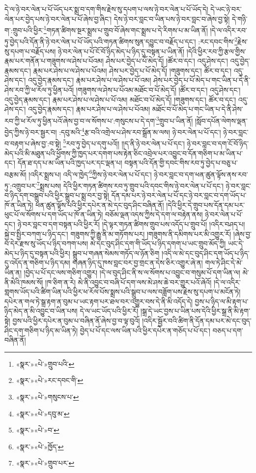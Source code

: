 དེ་ལ་ཉེ་བར་ལེན་པ་པོ་ཡོད་པར་སྨྲ་བ་དག་གིས་རྗེས་སུ་དཔག་པ་ལས་ཉེ་བར་ལེན་པ་པོ་ཡོད་དེ། དེ་ཡང་ཉེ་བར་ལེན་པར་བྱེད་པས་ཉེ་བར་ལེན་པ་པོ་ཞེས་བྱ་ཞིང་། དེས་ཉེ་བར་བླང་བ་ཡིན་པས་ཉེ་བར་བླང་བ་ཞེས་བྱ་སྟེ། དེ་གཉི་ག་:གྲུབ་པའི་ཕྱིར་\footnote{«སྣར་»«པེ་»གྲུབ་པའི་}གཏན་ཚིགས་སྔར་སྨྲས་པ་གྲུབ་བོ་ཞེས་གང་སྨྲས་པ་དེ་རིགས་པ་མ་ཡིན་ནོ། །དེ་ལ་འདིར་རབ་ཏུ་བྱེད་པའི་དོན་ནི་ཉེ་བར་ལེན་པ་པོ་ཡོད་པའི་གཏན་ཚིགས་སུན་དབྱུང་བ་བརྗོད་པ་དང་། :རང་དབང་གིས་\footnote{«སྣར་»«པེ་»རང་དབང་གི་}རྗེས་སུ་དཔག་པ་བརྗོད་པས། ཉེ་བར་ལེན་པ་པོ་ངོ་བོ་ཉིད་མེད་པ་ཉིད་དུ་བསྟན་པ་ཡིན་ནོ། །དེའི་ཕྱིར་རབ་ཀྱི་རྩལ་གྱིས་རྣམ་པར་གནོན་པ་གཟུགས་ལ་ཤེས་པ་པོའམ། ཤེས་པར་བྱེད་པ་པོ་མེད་དོ། །ཚོར་བ་དང་། འདུ་ཤེས་དང་། འདུ་བྱེད་རྣམས་དང་། རྣམ་པར་ཤེས་པ་ལ་ཤེས་པ་པོའམ། ཤེས་པར་བྱེད་པ་པོ་མེད་དོ། །གཟུགས་དང་། ཚོར་བ་དང་། འདུ་ཤེས་དང་། འདུ་བྱེད་རྣམས་དང་། རྣམ་པར་ཤེས་པ་ལ་ཤེས་པ་པོ་འམ། ཤེས་པར་བྱེད་པ་པོ་མེད་པ་གང་ཡིན་པ་དེ་ནི་ཤེས་རབ་ཀྱི་ཕ་རོལ་ཏུ་ཕྱིན་པའོ། །གཟུགས་ལ་ཤེས་པ་པོའམ་མཐོང་བ་པོ་མེད་དོ། །ཚོར་བ་དང་། འདུ་ཤེས་དང་། འདུ་བྱེད་རྣམས་དང་། རྣམ་པར་ཤེས་པ་ལ་ཤེས་པ་པོ་འམ། མཐོང་བ་པོ་མེད་དོ། །གཟུགས་དང་། ཚོར་བ་དང་། འདུ་ཤེས་དང་། འདུ་བྱེད་རྣམས་དང་། རྣམ་པར་ཤེས་པ་ལ་ཤེས་པ་པོའམ། མཐོང་བ་པོ་མེད་པ་གང་ཡིན་པ་དེ་ནི་ཤེས་རབ་ཀྱི་ཕ་རོལ་ཏུ་ཕྱིན་པའོ་ཞེས་བྱ་བ་ལ་སོགས་པ་:གསུངས་པ་དེ་དག་\footnote{«སྣར་»«པེ་»གསུངས་པ་}གྲུབ་པ་ཡིན་ནོ། །སློབ་དཔོན་ལེགས་ལྡན་བྱེད་ཀྱིས་ཉེ་བར་སྦྱར་བ། :དབུ་མའི་\footnote{«སྣར་»«པེ་»དབུ་མ་}རྩ་བའི་འགྲེལ་པ་ཤེས་རབ་སྒྲོན་མ་ལས། ཉེ་བར་ལེན་པ་པོ་དང་། ཉེ་བར་བླང་བ་བརྟག་པ་ཞེས་བྱ་:བ་སྟེ། \footnote{«སྣར་»«པེ་»བ་}རབ་ཏུ་བྱེད་པ་དགུ་པའོ།། །།ད་ནི་ཉེ་བར་ལེན་པ་པོ་དང་། ཉེ་བར་བླང་བ་དག་ངོ་བོ་ཉིད་མེད་པའི་མི་མཐུན་པའི་ཕྱོགས་ཀྱི་ཁྱད་པར་དགག་པས་རྟེན་ཅིང་འབྲེལ་པར་འབྱུང་བ་དོན་གཅིག་པ་མ་ཡིན་པ་དང་། དོན་ཐ་དད་པ་མ་ཡིན་པའི་ཁྱད་པར་དང་ལྡན་པ། བསྟན་པའི་དོན་གྱི་དབང་གིས་རབ་ཏུ་བྱེད་པ་བཅུ་པ་བརྩམ་མོ། །འདིར་སྨྲས་པ། འདི་ལ་ཁྱེད་\footnote{«སྣར་»«པེ་»ཁྱོད་}ཀྱིས་ཉེ་བར་ལེན་པ་པོ་དང་། ཉེ་བར་བླང་བ་དག་ཕན་ཚུན་ལྟོས་ནས་རབ་ཏུ་:འགྲུབ་པར་\footnote{«སྣར་»«པེ་»གྲུབ་པར་}སྨྲས་པས། དེའི་ཕྱིར་གཏན་ཚིགས་རབ་ཏུ་གྲུབ་པའི་དབང་གིས་ཉེ་བར་ལེན་པ་པོ་དང་། ཉེ་བར་བླང་བ་ཉིད་དག་བསྒྲུབ་པའི་ཕྱིར་སྒྲུབ་པ་སྨྲ་བར་བྱ་སྟེ། དོན་དམ་པར་ཉེ་བར་ལེན་པ་པོ་དང་ཉེ་བར་བླང་བ་དག་ཡོད་པ་ཁོ་ན་ཡིན་ཏེ། ཕན་ཚུན་ལྟོས་པའི་ཕྱིར་དཔེར་ན་མེ་དང་བུད་ཤིང་བཞིན་ནོ། །དེའི་ཕྱིར་དེ་གྲུབ་པས་དོན་དམ་པར་ཕུང་པོ་ལ་སོགས་པ་དག་ཡོད་པ་ཁོ་ན་ཡིན་ཏེ། བཅོམ་ལྡན་འདས་ཀྱིས་དེ་དག་ལ་བརྟེན་ནས། ཉེ་བར་ལེན་པ་པོ་དང་། ཉེ་བར་བླང་བ་དག་བསྟན་པའི་ཕྱིར་རོ། །དེ་ལྟར་གཏན་ཚིགས་གྲུབ་པས་འདོད་པ་གྲུབ་པོ། །འདིར་བཤད་པ། སྐྱེ་བ་སྤྱིར་བཀག་པ་ཉིད་དང་། གཟུགས་ཀྱི་རྒྱུ་ནི་མ་གཏོགས་པར། །གཟུགས་ནི་དམིགས་པར་མི་འགྱུར་རོ། །ཞེས་བྱ་བ་དེར་རྫས་སུ་ཡོད་པ་ཉིད་བཀག་པས། མེ་དང་བུད་ཤིང་དག་གི་ཡོད་པ་ཉིད་དགག་པ་ཡང་གྲུབ་མོད་ཀྱི། ཡང་དེ་མེད་པ་ཉིད་དུ་བསྟན་པའི་ཕྱིར། སྒྲུབ་པ་གཞན་སེམས་གཏོད་ལ་ཉོན་ཅིག །འདི་ལ་མེ་དང་བུད་ཤིང་དག་ཡོད་པ་ཉིད་དུ་འདོད་ན་གཅིག་པ་ཉིད་དམ། གཞན་ཉིད་དུ་ཁས་བླང་བར་བྱ་གྲང་ན་དེས་ཅིར་འགྱུར་ཞེ་ན། གལ་ཏེ་ཤིང་དེ་མེ་ཡིན་ན། །བྱེད་པ་པོ་དང་ལས་གཅིག་འགྱུར། །དེ་ལ་བུད་ཤིང་ནི་ས་ལ་སོགས་པ་འབྱུང་བ་གསུམ་པོ་དག་ཡིན་ལ། མེ་ནི་མེའི་ཁམས་སོ། །ཁ་ཅིག་ན་རེ། མེ་ནི་འབྱུང་བ་བཞི་པོ་དག་ལས་མེ་ཤས་ཆེ་བར་གྱུར་པའོ་ཞེའོ། །དེ་ལ་འདིར་གླགས་ཡོད་པའི་ཚིག་ཡིན་པའི་ཕྱིར་ཕ་རོལ་པོས་སྨྲས་པའི་སྒྲུབ་པ་ལས་བཟློག་པས་རྗེས་སུ་དཔག་པ་མངོན་ཏེ། དཔེར་ན་གལ་ཏེ་སྒྲ་རྟག་ན་བུམ་པ་ཡང་རྟག་པར་ཐལ་བར་འགྱུར་བས་དེ་ནི་མི་འདོད་དེ། བྱས་པ་ཉིད་ལ་མི་རྟག་པ་ཉིད་མེད་ན་མི་འབྱུང་བ་ཡིན་པས། དེ་ལ་ཡང་ཡོད་པའི་ཕྱིར་རོ། །སྒྲ་དེ་ཡང་བྱས་པ་ཡིན་པས་དེའི་ཕྱིར་སྒྲ་ནི་མི་རྟག་སྟེ། བྱས་པའི་ཕྱིར་དཔེར་ན་བུམ་པ་བཞིན་ནོ་ཞེས་བྱ་བ་ལྟ་བུའོ། །འདིར་སྦྱོར་བའི་ཚིག་ནི་དོན་དམ་པར་མེ་དང་བུད་ཤིང་དག་གཅིག་པ་ཉིད་མ་ཡིན་ཏེ། བྱེད་པ་པོ་དང་ལས་ཡིན་པའི་ཕྱིར་དཔེར་ན་གཅོད་པ་པོ་དང་། བཅད་པ་དག་བཞིན་ནོ། 